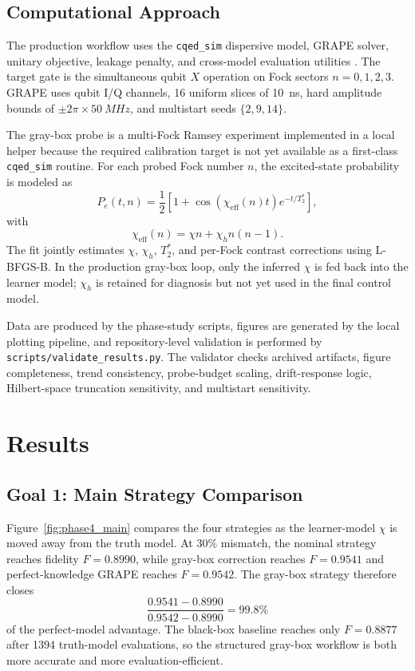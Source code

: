 \documentclass[aps,pra,twocolumn,reprint,amsmath,amssymb]{revtex4-2}
\begin{document}
\subsection{Computational Approach}

The production workflow uses the \texttt{cqed\_sim} dispersive model, GRAPE solver,
unitary objective, leakage penalty, and cross-model evaluation utilities
\cite{cqedsim2025}. The target gate is the simultaneous qubit $X$ operation on Fock sectors
$n=0,1,2,3$. GRAPE uses qubit I/Q channels, 16 uniform slices of \SI{10}{ns}, hard amplitude
bounds of $\pm 2\pi \times \SI{50}{MHz}$, and multistart seeds $\{2, 9, 14\}$.

The gray-box probe is a multi-Fock Ramsey experiment implemented in a local helper because the
required calibration target is not yet available as a first-class \texttt{cqed\_sim} routine.
For each probed Fock number $n$, the excited-state probability
is modeled as
\begin{equation}
P_e(t,n) = \frac{1}{2}\left[1 + \cos\left(\chi_{\mathrm{eff}}(n)t\right)e^{-t/T_2^\ast}\right],
\end{equation}
with
\begin{equation}
\chi_{\mathrm{eff}}(n) = \chi n + \chi_h n(n-1).
\end{equation}
The fit jointly estimates $\chi$, $\chi_h$, $T_2^\ast$, and per-Fock contrast corrections
using L-BFGS-B. In the production gray-box loop, only the inferred $\chi$ is fed back into the
learner model; $\chi_h$ is retained for diagnosis but not yet used in the final control model.

Data are produced by the phase-study scripts, figures are generated by the local plotting
pipeline, and repository-level validation is performed by
\texttt{scripts/validate\_results.py}. The validator checks archived artifacts, figure completeness,
trend consistency, probe-budget scaling, drift-response logic, Hilbert-space truncation
sensitivity, and multistart sensitivity.

\section{Results}

\subsection{Goal 1: Main Strategy Comparison}

Figure~\ref{fig:phase4_main} compares the four strategies as the learner-model $\chi$ is moved
away from the truth model. At 30\% mismatch, the nominal strategy reaches fidelity
$F = 0.8990$, while gray-box correction reaches $F = 0.9541$ and perfect-knowledge GRAPE
reaches $F = 0.9542$. The gray-box strategy therefore closes
\begin{equation}
\frac{0.9541 - 0.8990}{0.9542 - 0.8990} = 99.8\%
\end{equation}
of the perfect-model advantage. The black-box baseline reaches only $F = 0.8877$ after 1394
truth-model evaluations, so the structured gray-box workflow is both more accurate and more
evaluation-efficient.
\end{document}
